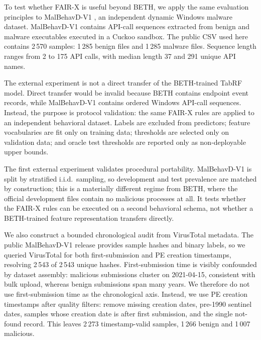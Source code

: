 \documentclass[10pt,journal,compsoc]{IEEEtran}
\begin{document}
To test whether FAIR-X is useful beyond BETH, we apply the same evaluation principles to MalBehavD-V1 \cite{maniriho2023,malbehavd2023}, an independent dynamic Windows malware dataset. MalBehavD-V1 contains API-call sequences extracted from benign and malware executables executed in a Cuckoo sandbox. The public CSV used here contains 2\,570 samples: 1\,285 benign files and 1\,285 malware files. Sequence length ranges from 2 to 175 API calls, with median length 37 and 291 unique API names.

The external experiment is not a direct transfer of the BETH-trained TabRF model. Direct transfer would be invalid because BETH contains endpoint event records, while MalBehavD-V1 contains ordered Windows API-call sequences. Instead, the purpose is protocol validation: the same FAIR-X rules are applied to an independent behavioral dataset. Labels are excluded from predictors; feature vocabularies are fit only on training data; thresholds are selected only on validation data; and oracle test thresholds are reported only as non-deployable upper bounds.

The first external experiment validates procedural portability. MalBehavD-V1 is split by stratified i.i.d.\ sampling, so development and test prevalence are matched by construction; this is a materially different regime from BETH, where the official development files contain no malicious processes at all. It tests whether the FAIR-X rules can be executed on a second behavioral schema, not whether a BETH-trained feature representation transfers directly.

We also construct a bounded chronological audit from VirusTotal metadata. The public MalBehavD-V1 release provides sample hashes and binary labels, so we queried VirusTotal for both first-submission and PE creation timestamps, resolving 2\,543 of 2\,543 unique hashes. First-submission time is visibly confounded by dataset assembly: malicious submissions cluster on 2021-04-15, consistent with bulk upload, whereas benign submissions span many years. We therefore do not use first-submission time as the chronological axis. Instead, we use PE creation timestamps after quality filters: remove missing creation dates, pre-1990 sentinel dates, samples whose creation date is after first submission, and the single not-found record. This leaves 2\,273 timestamp-valid samples, 1\,266 benign and 1\,007 malicious.
\end{document}
